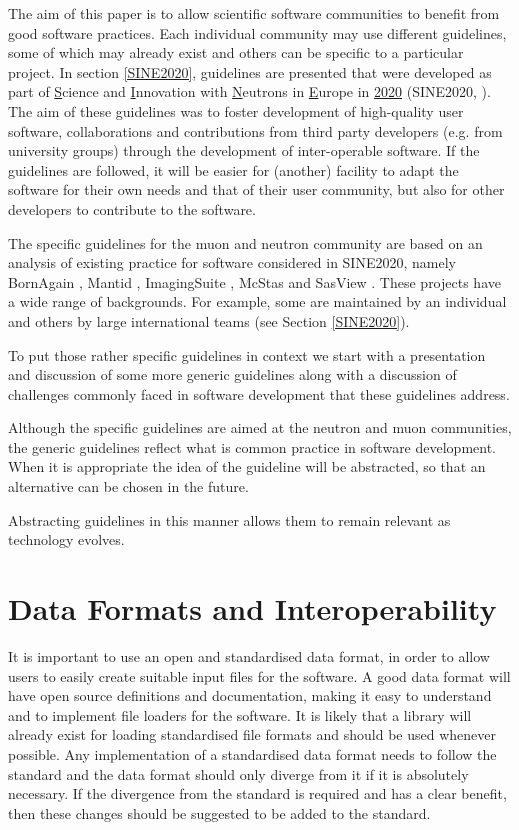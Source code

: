 \documentclass[jnr]{iosart2x}
\begin{document}
The aim of this paper is to allow scientific software communities to benefit from good software practices.
Each individual community may use different guidelines, some of which may already exist and others can be specific to a particular project.
In section \ref{SINE2020}, guidelines are presented that were developed as part of \underline{S}cience and \underline{I}nnovation with \underline{N}eutrons in \underline{E}urope in \underline{2020} (SINE2020, \cite{sine2020}).
The aim of these guidelines was to foster development of high-quality user software,  collaborations and contributions from third party developers (e.g. from university groups) through the development of inter-operable software.
If the guidelines are followed, it will be easier for (another) facility to adapt the software for their own needs and that of their user community, but also for other developers to contribute to the software.

The specific guidelines for the muon and neutron community are based on an analysis of existing practice for software considered in SINE2020, namely  BornAgain \cite{bornagain}, Mantid \cite{mantid}, ImagingSuite \cite{ImagingSuite}, McStas \cite{mcstas} and SasView \cite{sasview}.
These projects have a wide range of backgrounds.
For example, some are maintained by an individual and others by large international teams (see Section \ref{SINE2020}).

To put those rather specific guidelines in context we start with a presentation and discussion of some more generic guidelines along with a discussion of challenges commonly faced in software development that these guidelines address.

Although the specific guidelines are aimed at the neutron and muon communities, the generic guidelines reflect what is common practice in software development.
When it is appropriate the idea of the guideline will be abstracted, so that an alternative can be chosen in the future.

Abstracting guidelines in this manner allows them to remain relevant as technology evolves.

\section{Data Formats and Interoperability}
\label{Data Formats and Interoperability}

It is important to use an open and standardised data format, in order to allow users to easily create suitable input files for the software.
A good data format will have open source definitions and documentation, making it easy to understand and to implement file loaders for the software.
It is likely that a library will already exist for loading standardised file formats and should be used whenever possible.
Any implementation of a standardised data format needs to follow the standard and
the data format should only diverge from it if it is absolutely necessary.
If the divergence from the standard is required and has a clear benefit, then these changes should be suggested to be added to the standard.
\end{document}

